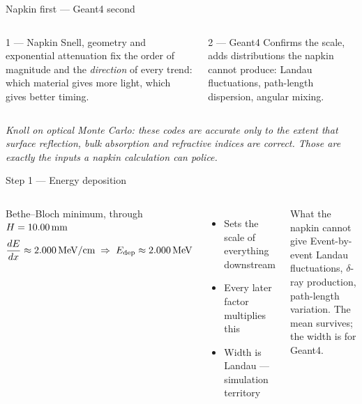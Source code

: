 \documentclass[aspectratio=169,9pt]{beamer}
\begin{document}
\begin{frame}{Napkin first — Geant4 second}
  \begin{columns}[T]
      \begin{block}{1 — Napkin}
        {\small Snell, geometry and exponential attenuation fix
        the order of magnitude and the \emph{direction} of every trend:
        which material gives more light, which gives better timing.}
      \end{block}

      \begin{block}{2 — Geant4}
        {\small Confirms the scale, adds distributions the napkin cannot produce:
        Landau fluctuations, path-length dispersion, angular mixing.}
      \end{block}
  \end{columns}
  \vspace{6pt}
  \begin{alertblock}{}
    {\small\itshape Knoll on optical Monte Carlo: these codes are accurate only to the
    extent that surface reflection, bulk absorption and refractive indices are correct.
    Those are exactly the inputs a napkin calculation can police.}
  \end{alertblock}
\end{frame}

\begin{frame}{Step 1 — Energy deposition}
  \begin{columns}[T]
      \begin{block}{Bethe–Bloch minimum, through $H = 10.00\,\text{mm}$}
        \[
          \frac{dE}{dx}\approx2.000\,\text{MeV/cm}
          \;\Rightarrow\;
          E_{\mathrm{dep}}\approx2.000\,\text{MeV}
        \]
      \end{block}
      \begin{itemize}\setlength\itemsep{3pt}
        \item Sets the scale of everything downstream
        \item Every later factor multiplies this \NapdEMeV
        \item Width is Landau — simulation territory
      \end{itemize}

      \begin{alertblock}{What the napkin cannot give}
        {\small Event-by-event Landau fluctuations, $\delta$-ray production,
        path-length variation.  The mean survives; the width is for Geant4.}
      \end{alertblock}
  \end{columns}
\end{frame}
\end{document}
